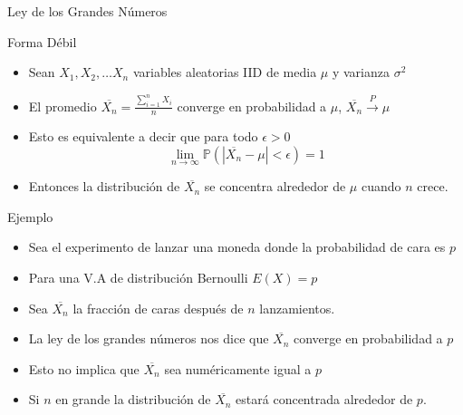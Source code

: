 \documentclass[handout]{beamer}
\begin{document}
\begin{frame}{Ley de los Grandes Números}
\scriptsize{
\begin{block}{Forma Débil}
\begin{itemize}
 \item Sean $X_{1},X_{2},\dots X_{n}$ variables aleatorias IID de media $\mu$ y varianza $\sigma^2$
 \item El promedio $\overline{X_{n}} =\frac{\sum_{i=1}^{n}X_{i}}{n}$ converge en probabilidad a $\mu$, $\overline{X_{n}} \overset{P}{\rightarrow} \mu$   
 \item Esto es equivalente a decir que para todo $\epsilon > 0$
 \begin{displaymath}
  \lim_{n\rightarrow \infty} \mathbb{P}(|\overline{X_{n}} - \mu| < \epsilon)=1
 \end{displaymath}
\item Entonces la distribución de $\overline{X_{n}}$ se concentra alrededor de $\mu$ cuando $n$ crece.
\end{itemize}
\end{block}
\begin{block}{Ejemplo}
\begin{itemize}
 \item Sea el experimento de lanzar una moneda donde la probabilidad de cara es $p$
 \item Para una V.A de distribución Bernoulli $E(X)=p$
 \item Sea $\overline{X_{n}}$ la fracción de caras después de $n$ lanzamientos.
 \item La ley de los grandes números nos dice que  $\overline{X_{n}}$ converge en probabilidad a $p$
 \item Esto no implica que  $\overline{X_{n}}$ sea numéricamente igual a $p$
 \item Si $n$ en grande la distribución de  $\overline{X_{n}}$ estará concentrada alrededor de $p$.
\end{itemize}

 
\end{block}



}
 
\end{frame}
\end{document}
